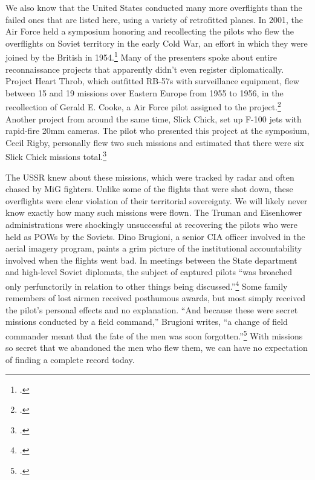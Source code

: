 \documentclass[14pt]{extarticle}
\begin{document}
We also know that the United States conducted many more overflights than the failed ones that are listed here, using a variety of retrofitted planes. In 2001, the Air Force held a symposium honoring and recollecting the pilots who flew the overflights on Soviet territory in the early Cold War, an effort in which they were joined by the British in 1954.\footcite[p.~v]{hall_early_2003} Many of the presenters spoke about entire reconnaissance projects that apparently didn't even register diplomatically. Project Heart Throb, which outfitted RB-57s with surveillance equipment, flew between 15 and 19 missions over Eastern Europe from 1955 to 1956, in the recollection of Gerald E. Cooke, a Air Force pilot assigned to the project.\footcite[p.~194]{hall_early_2003} Another project from around the same time, Slick Chick, set up F-100 jets with rapid-fire 20mm cameras. The pilot who presented this project at the symposium, Cecil Rigby, personally flew two such missions and estimated that there were six Slick Chick missions total.\footcite[p.~176]{hall_early_2003}

The USSR knew about these missions, which were tracked by radar and often chased by MiG fighters. Unlike some of the flights that were shot down, these overflights were clear violation of their territorial sovereignty. We will likely never know exactly how many such missions were flown. The Truman and Eisenhower administrations were shockingly unsuccessful at recovering the pilots who were held as POWs by the Soviets. Dino Brugioni, a senior CIA officer involved in the aerial imagery program, paints a grim picture of the institutional accountability involved when the flights went bad. In meetings between the State department and high-level Soviet diplomats, the subject of captured pilots \enquote{was broached only perfunctorily in relation to other things being discussed.}\footcite[p.~72]{brugioni_eyes_2010} Some family remembers of lost airmen received posthumous awards, but most simply received the pilot's personal effects and no explanation. \enquote{And because these were secret missions conducted by a field command,} Brugioni writes, \enquote{a change of field commander meant that the fate of the men was soon forgotten.}\footcite[p.~72]{brugioni_eyes_2010} With missions so secret that we abandoned the men who flew them, we can have no expectation of finding a complete record today.
\end{document}
